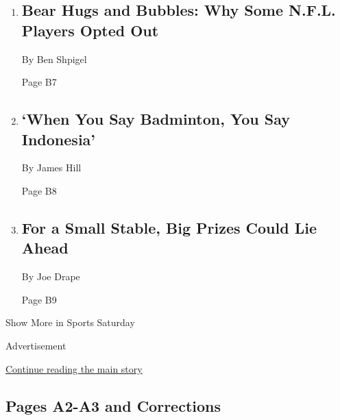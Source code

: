 \begin{enumerate}
\def\labelenumi{\arabic{enumi}.}
\item
  \href{/2020/08/08/sports/football/nfl-players-opt-out.html}{}

  \hypertarget{bear-hugs-and-bubbles-why-some-nfl-players-opted-out-1}{%
  \subsection{Bear Hugs and Bubbles: Why Some N.F.L. Players Opted
  Out}\label{bear-hugs-and-bubbles-why-some-nfl-players-opted-out-1}}

  By Ben Shpigel

  Page B7
\item
  \href{/2020/08/07/sports/badminton-indonesia.html}{}

  \hypertarget{when-you-say-badminton-you-say-indonesia}{%
  \subsection{`When You Say Badminton, You Say
  Indonesia'}\label{when-you-say-badminton-you-say-indonesia}}

  By James Hill

  Page B8
\item
  \href{/2020/08/07/sports/tiz-the-law-millions.html}{}

  \hypertarget{for-a-small-stable-big-prizes-could-lie-ahead}{%
  \subsection{For a Small Stable, Big Prizes Could Lie
  Ahead}\label{for-a-small-stable-big-prizes-could-lie-ahead}}

  By Joe Drape

  Page B9
\end{enumerate}

Show More in Sports Saturday

Advertisement

\protect\hyperlink{after-mid5}{Continue reading the main story}

\hypertarget{pages-a2-a3-and-corrections}{%
\subsection{Pages A2-A3 and
Corrections}\label{pages-a2-a3-and-corrections}}

